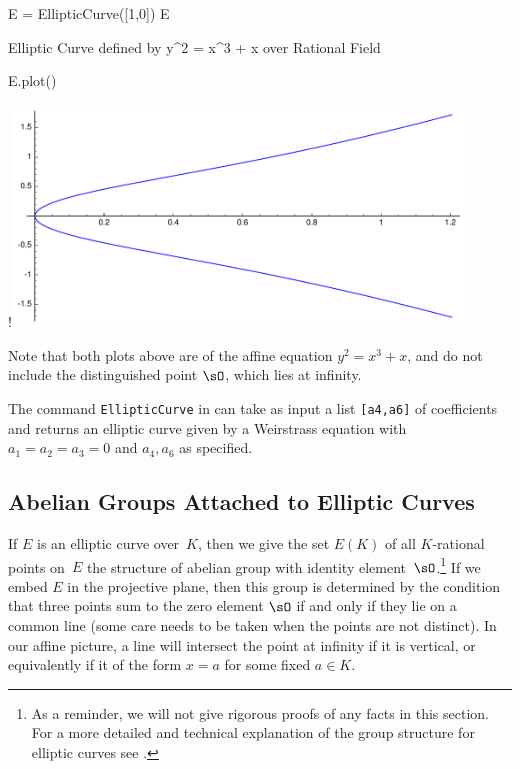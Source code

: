 \begin{sagecode}
\begin{sagecell}
E = EllipticCurve([1,0])
E
\end{sagecell}
\begin{sageout}
Elliptic Curve defined by y^2 = x^3 + x over
Rational Field
\end{sageout}
\end{sagecode}
\begin{sagecode}
\begin{sagecell} %
E.plot()
\end{sagecell}
\begin{sageout}[escapechar=!]
!\includegraphics[width=0.9\textwidth]{img/ecq}
\end{sageout}
\end{sagecode}

Note that both plots above are of the affine equation $y^2 = x^3 + x$, and do
not include the distinguished point $\sO$, which lies at infinity.

\begin{remark}
  The command {\tt{EllipticCurve}} in {\Sage}
  can take as input a list {\tt{[a4,a6]}}
  of coefficients and returns an elliptic curve given
  by a Weirstrass equation with $a_1=a_2=a_3=0$ and
  $a_4,a_6$ as specified.
\end{remark}

\subsection{Abelian Groups Attached to Elliptic Curves}

If $E$ is an elliptic curve over~$K$, then we give the set
$E(K)$ of all $K$-rational points on~$E$ the structure of abelian
group with identity element~$\sO$.\footnote{
  As a reminder, we will not give rigorous proofs of any facts in
  this section. For a more detailed and technical explanation of
  the group structure for elliptic curves
  see \cite[Ch.~III.2]{silverman:aec}.
}
If we embed $E$ in the projective plane, then this group is determined
by the condition that three points sum to the zero element $\sO$
if and only if they lie on a common line (some care needs to be taken
when the points are not distinct). In our affine picture, a line will
intersect the point at infinity if it is vertical, or equivalently if
it of the form $x=a$ for some fixed $a\in K$.


